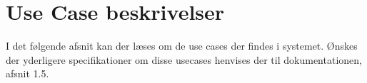 \section{Use Case beskrivelser}

I det følgende afsnit kan der læses om de use cases der findes i systemet. Ønskes der yderligere specifikationer om disse usecases henvises der til dokumentationen, afsnit 1.5. \\








